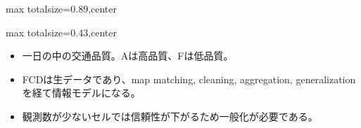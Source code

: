 \begin{minipage}[t]{0.58\textwidth}
\begin{adjustbox}{max totalsize={\textwidth}{0.89\textheight},center}
\begin{minipage}{\textwidth}
\end{minipage}
\end{adjustbox}
\end{minipage}


\clearpage
{}
\begin{minipage}[t]{0.405\textwidth}
\begin{adjustbox}{max totalsize={\textwidth}{0.43\textheight},center}
\begin{minipage}{\textwidth}\scriptsize
{}\begin{itemize}
\item 一日の中の交通品質。Aは高品質、Fは低品質。
\end{itemize}\begin{itemize}
\item FCDは生データであり、map matching, cleaning, aggregation, generalization を経て情報モデルになる。
\item 観測数が少ないセルでは信頼性が下がるため一般化が必要である。
\end{itemize}
\end{minipage}
\end{adjustbox}
\end{minipage}\hfill
